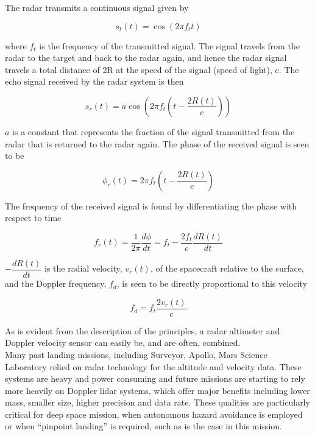 The radar transmits a continuous signal given by

\begin{equation}
s_t(t)=\cos (2 \pi f_t t)
\end{equation}


where $f_t$ is the frequency of the transmitted signal. The signal travels
from the radar to the target and back to the radar again, and hence the radar signal
travels a total distance of 2R at the speed of the signal (speed of light), c. The echo signal received by the radar
system is then

\begin{equation}
s_r(t)=a \cos(2 \pi f_t(t-\dfrac{2R(t)}{c}))
\end{equation}

$a$ is a constant that represents the fraction of the signal transmitted from the radar
that is returned to the radar again. The phase of the received signal is seen to be 

\begin{equation}
\phi_r(t)=2 \pi f_t(t-\dfrac{2R(t)}{c})
\end{equation}


The frequency of the received signal is found by differentiating the phase with respect
to time

\begin{equation}
f_r(t)=\dfrac{1}{2 \pi}\dfrac{d\phi}{dt} = f_t - \dfrac{2 f_t}{c}\dfrac{dR(t)}{dt}
\end{equation}

$-\dfrac{dR(t)}{dt}$ is the radial velocity, $v_r(t)$, of the spacecraft relative to the surface, and the Doppler frequency, $f_d$, is seen to be directly proportional to this velocity

\begin{equation}
f_d= f_t\dfrac{2 v_r(t)}{c}
\end{equation}

As is evident from the description of the principles, a radar altimeter and Doppler velocity sensor can easily be, and are often, combined. \\

Many past landing missions, including Surveyor, Apollo, Mars Science Laboratory relied on radar
technology for the altitude and velocity data. These systems are heavy and power consuming and future missions are starting to rely more heavily on Doppler lidar systems, which offer major benefits including lower mass, smaller
size, higher precision and data rate. These qualities are particularly critical for deep space mission, when autonomous hazard avoidance is employed or when “pinpoint landing” is required, such as is the case in this mission.


